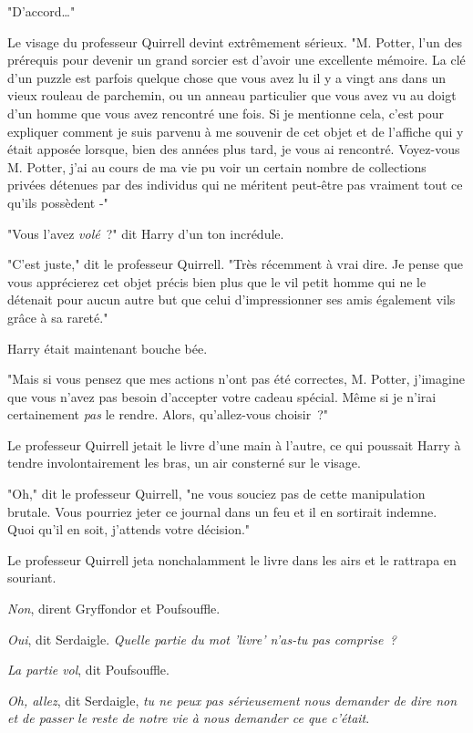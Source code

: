 "D'accord…"

Le visage du professeur Quirrell devint extrêmement sérieux. "M. Potter, l'un des prérequis pour devenir un grand sorcier est d'avoir une excellente mémoire. La clé d'un puzzle est parfois quelque chose que vous avez lu il y a vingt ans dans un vieux rouleau de parchemin, ou un anneau particulier que vous avez vu au doigt d'un homme que vous avez rencontré une fois. Si je mentionne cela, c'est pour expliquer comment je suis parvenu à me souvenir de cet objet et de l'affiche qui y était apposée lorsque, bien des années plus tard, je vous ai rencontré. Voyez-vous M. Potter, j'ai au cours de ma vie pu voir un certain nombre de collections privées détenues par des individus qui ne méritent peut-être pas vraiment tout ce qu'ils possèdent -"

"Vous l'avez \emph{volé}~?" dit Harry d'un ton incrédule.

"C'est juste," dit le professeur Quirrell. "Très récemment à vrai dire. Je pense que vous apprécierez cet objet précis bien plus que le vil petit homme qui ne le détenait pour aucun autre but que celui d'impressionner ses amis également vils grâce à sa rareté."

Harry était maintenant bouche bée.

"Mais si vous pensez que mes actions n'ont pas été correctes, M. Potter, j'imagine que vous n'avez pas besoin d'accepter votre cadeau spécial. Même si je n'irai certainement \emph{pas} le rendre. Alors, qu'allez-vous choisir~?"

Le professeur Quirrell jetait le livre d'une main à l'autre, ce qui poussait Harry à tendre involontairement les bras, un air consterné sur le visage.

"Oh," dit le professeur Quirrell, "ne vous souciez pas de cette manipulation brutale. Vous pourriez jeter ce journal dans un feu et il en sortirait indemne. Quoi qu'il en soit, j'attends votre décision."

Le professeur Quirrell jeta nonchalamment le livre dans les airs et le rattrapa en souriant.

\emph{Non}, dirent Gryffondor et Poufsouffle.

\emph{Oui}, dit Serdaigle. \emph{Quelle partie du mot 'livre' n'as-tu pas comprise~?}

\emph{La partie vol}, dit Poufsouffle.

\emph{Oh, allez}, dit Serdaigle, \emph{tu ne peux pas sérieusement nous demander de dire non et de passer le reste de notre vie à nous demander ce que c'était}.


